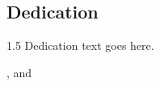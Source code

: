 \begin{center}
  \section*{Dedication}
\end{center}

\begin{spacing}{1.5}
Dedication text goes here.
\end{spacing}

\begin{flushright}
  {\firststudentname}, {\secondstudentname} and {\thirdstudentname}
\end{flushright}

\clearpage
\vspace*{2cm}
